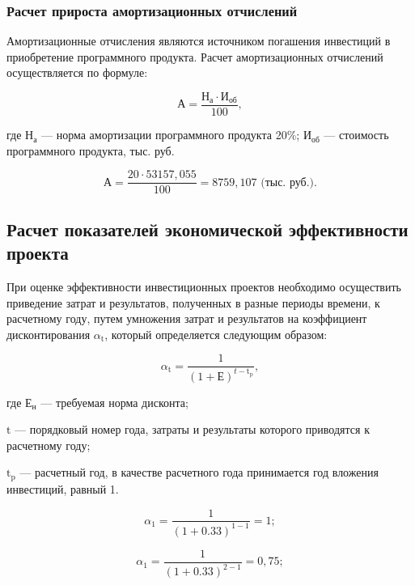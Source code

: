 \subsubsection{Расчет прироста амортизационных отчислений}

Амортизационные отчисления являются источником погашения инвестиций в приобретение программного продукта. Расчет амортизационных отчислений осуществляется по формуле:

\begin{displaymath}
  \text{А} = \frac{\text{Н}_{\text{а}}\cdot\text{И}_{\text{об}}}{100},
\end{displaymath}

где \(\text{Н}_{\text{а}}\) --- норма амортизации программного продукта 20\%;
\(\text{И}_{\text{об}}\) --- стоимость программного продукта, тыс. руб.

\begin{displaymath}
  \text{А} = \frac{20\cdot53157,055}{100} = 8759,107 \text{ (тыс. руб.)}.
\end{displaymath}

\subsection{Расчет показателей экономической эффективности проекта}

При оценке эффективности инвестиционных проектов необходимо осуществить приведение затрат и результатов, полученных в разные периоды времени, к  расчетному году,  путем умножения затрат и результатов на коэффициент дисконтирования \(\alpha_{\text{t}}\), который определяется следующим образом:

\begin{displaymath}
  \alpha_{\text{t}} = \frac{1}{(1+\text{Е})^{t-\text{t}_{\text{p}}}},
\end{displaymath}

где \(\text{Е}_{\text{н}}\) --- требуемая норма дисконта;  

\(\text{t}\) --- порядковый номер года, затраты и результаты которого приводятся к расчетному году;

\(\text{t}_{\text{p}}\) --- расчетный год, в качестве расчетного года принимается год вложения инвестиций, равный 1.

\begin{displaymath}
  \alpha_{\text{1}} = \frac{1}{(1+0.33)^{1-1}} = 1;
\end{displaymath}

\begin{displaymath}
  \alpha_{\text{1}} = \frac{1}{(1+0.33)^{2-1}} = 0,75;
\end{displaymath}


